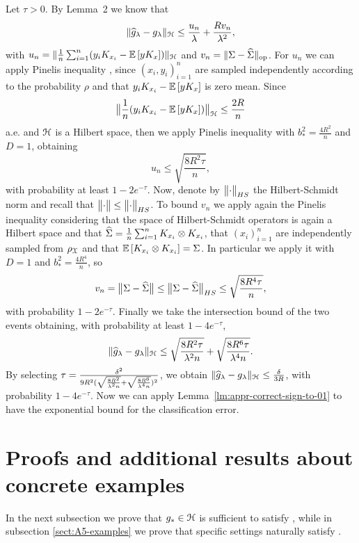 Let $\tau > 0$. By Lemma~2 we know that
$$\|\widehat{g}_\lambda - g_\lambda\|_{\mathcal H} \leq \frac{u_n}{\lambda} + \frac{R v_n}{\lambda^2},$$
with $u_n = \|\frac{1}{n} \sum_{i=1}^n (y_i K_{x_i} - \mathbb{E}\left[{y K_x}\right])\|_{\mathcal H}$ and $v_n = \|\Sigma - \widehat{\Sigma}\|_{\textrm {op}}$. 
For $u_n$ we can apply Pinelis inequality \citep[Thm.~3.5][]{pinelis1994optimum}, since $(x_i, y_i)_{i=1}^n$ are sampled independently according to the probability $\rho$ and that $y_i K_{x_i} - \mathbb{E}\left[{y K_{x}}\right]$ is zero mean. Since $$\bigl\|{\frac{1}{n}(y_i K_{x_i} - \mathbb{E}\left[{y K_{x}}\right])}\bigr\|_\mathcal H \leq \frac{2R}{n}$$ a.e. and $\mathcal H$ is a Hilbert space, then we apply Pinelis inequality with $b^2_* = \frac{4R^2}{n}$ and $D = 1$, obtaining
$$u_n \leq \sqrt{\frac{8R^2 \tau}{n}},$$
with probability at least $1 - 2e^{-\tau}$.
Now, denote by $\bigl\|{\cdot}\bigr\|_{HS}$ the Hilbert-Schmidt norm and recall that $\bigl\|{\cdot}\bigr\| \leq \bigl\|{\cdot}\bigr\|_{HS}$.  To bound $v_n$ we apply again the Pinelis inequality \citep[see also][]{rosasco2010learning} considering that the space of Hilbert-Schmidt operators is again a Hilbert space and that $\widehat{\Sigma} = \frac{1}{n} \sum_{i=1}^n K_{x_i} \otimes K_{x_i}$, that $(x_i)_{i=1}^n$ are independently sampled from ${\rho_{{\mathcal X}}}$ and that $\mathbb{E}\left[{K_{x_i} \otimes K_{x_i}}\right] = \Sigma$. In particular we apply it with $D = 1$ and $b^2_* = \frac{4R^4}{n}$, so
$$v_n = \bigl\|{\Sigma - \widehat{\Sigma}}\bigr\| \leq \bigl\|{\Sigma - \widehat{\Sigma}}\bigr\|_{HS} \leq \sqrt{\frac{8 R^4 \tau}{n}},$$
with probability $1-2e^{-\tau}$.
Finally we take the intersection bound of the two events obtaining, with probability at least $1-4e^{-\tau}$,
$$\|\widehat{g}_\lambda - g_\lambda\|_{\mathcal H} \leq \sqrt{\frac{8R^2 \tau}{\lambda^2 n}} + \sqrt{\frac{8R^6\tau}{\lambda^4 n}}.$$
By selecting $\tau = \frac{\delta^2}{9R^2(\sqrt{\frac{8R^2}{\lambda^2 n}} + \sqrt{\frac{8R^6}{\lambda^4 n}})^2}$, we obtain $\|\widehat{g}_\lambda - g_\lambda\|_{\mathcal H} \leq \frac{\delta}{3R}$, with probability $1-4e^{-\tau}$.
Now we can apply Lemma~\ref{lm:appr-correct-sign-to-01} to have the exponential bound for the classification error.
\epr




\section{Proofs and additional results about concrete examples}
\label{sect:examples-for-glambda}

In the next subsection we prove that $g_\ast \in \mathcal H$ is sufficient to satisfy , while in subsection \ref{sect:A5-examples} we prove that specific settings naturally satisfy .


